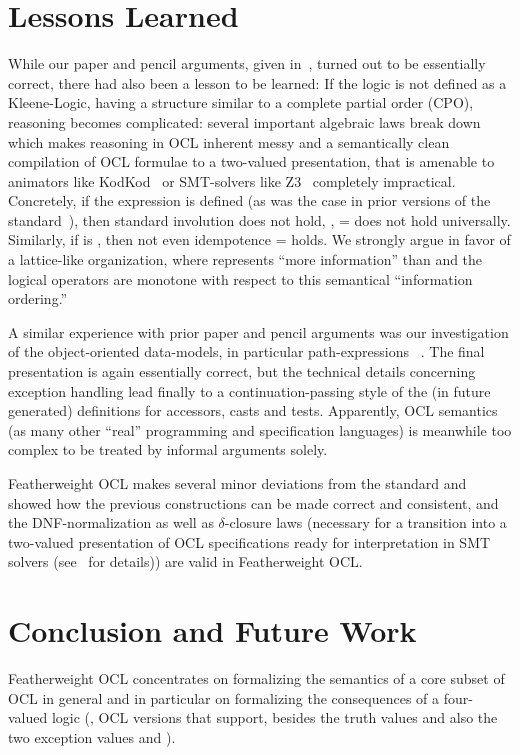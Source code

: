\section{Lessons Learned}
While our paper and pencil arguments, given
in~\cite{brucker.ea:ocl-null:2009}, turned out to be essentially
correct, there had also been a lesson to be learned: If the logic is
not defined as a Kleene-Logic, having a structure similar to a
complete partial order (CPO), reasoning becomes complicated: several
important algebraic laws break down which makes reasoning in OCL
inherent messy and a semantically clean compilation of OCL formulae to
a two-valued presentation, that is amenable to animators like
KodKod~\cite{torlak.ea:kodkod:2007} or SMT-solvers like
Z3~\cite{moura.ea:z3:2008} completely impractical. Concretely, if the
expression  is defined  (as was
the case in prior versions of the standard~\cite{omg:ocl:2012}), then standard
involution does not hold, \ie,  = 
does not hold universally. Similarly, if  is
, then not even idempotence  =
 holds. We strongly argue in favor of a lattice-like
organization, where  represents ``more information''
than  and the logical operators are monotone with
respect to this semantical ``information ordering.''

A similar experience with prior paper and pencil arguments was our
investigation of the object-oriented data-models, in particular
path-expressions ~\cite{brucker.ea:path-expressions:2013}. The final
presentation is again essentially correct, but the technical details
concerning exception handling lead finally to a continuation-passing
style of the (in future generated) definitions for accessors, casts
and tests.  Apparently, OCL semantics (as many other ``real''
programming and specification languages) is meanwhile too complex to
be treated by informal arguments solely.

Featherweight OCL makes several minor deviations from the standard and
showed how the previous constructions can be made correct and
consistent, and the DNF-normalization as well as $\delta$-closure laws
(necessary for a transition into a two-valued presentation of OCL
specifications ready for interpretation in SMT solvers
(see~\cite{brucker.ea:ocl-testing:2010} for details)) are valid in
Featherweight OCL.

\section{Conclusion and Future Work}
Featherweight OCL concentrates on formalizing the semantics of a core
subset of OCL in general and in particular on formalizing the
consequences of a four-valued logic (\ie, OCL versions that support,
besides the truth values  and  also
the two exception values  and ).

